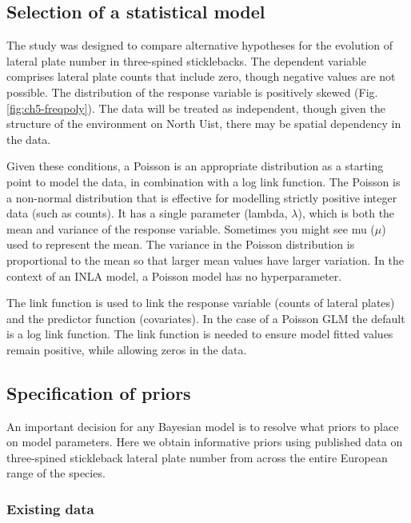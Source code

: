 \documentclass[
]{book}
\begin{document}
\hypertarget{pois-select}{%
\subsection{Selection of a statistical model}\label{pois-select}}

The study was designed to compare alternative hypotheses for the evolution of lateral plate number in three-spined sticklebacks. The dependent variable comprises lateral plate counts that include zero, though negative values are not possible. The distribution of the response variable is positively skewed (Fig. \ref{fig:ch5-freqpoly}). The data will be treated as independent, though given the structure of the environment on North Uist, there may be spatial dependency in the data.

Given these conditions, a Poisson is an appropriate distribution as a starting point to model the data, in combination with a log link function. The Poisson is a non-normal distribution that is effective for modelling strictly positive integer data (such as counts). It has a single parameter (lambda, \(\lambda\)), which is both the mean and variance of the response variable. Sometimes you might see mu (\(\mu\)) used to represent the mean. The variance in the Poisson distribution is proportional to the mean so that larger mean values have larger variation. In the context of an INLA model, a Poisson model has no hyperparameter.

The link function is used to link the response variable (counts of lateral plates) and the predictor function (covariates). In the case of a Poisson GLM the default is a log link function. The link function is needed to ensure model fitted values remain positive, while allowing zeros in the data.

\hypertarget{pois-prior-spec}{%
\subsection{Specification of priors}\label{pois-prior-spec}}

An important decision for any Bayesian model is to resolve what priors to place on model parameters. Here we obtain informative priors using published data on three-spined stickleback lateral plate number from across the entire European range of the species.

\hypertarget{existing-data}{%
\subsubsection{Existing data}\label{existing-data}}
\end{document}
